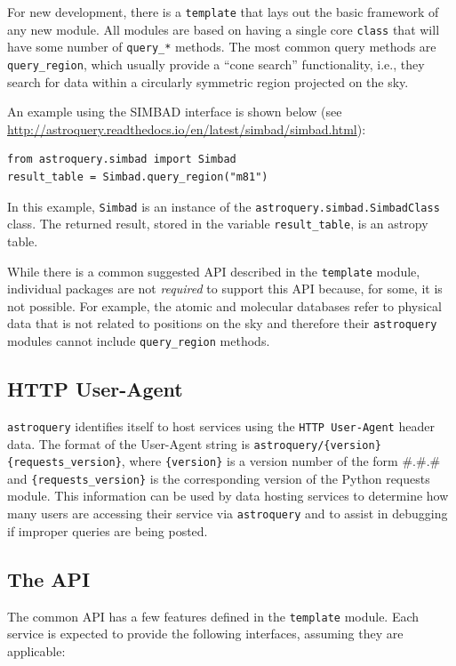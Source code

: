\documentclass[twocolumn]{aastex61}
\newcommand{\package}[1]{\texttt{#1}\xspace}
\newcommand{\astroquery}{\package{astroquery}}
\begin{document}
For new development, there is a \texttt{template}  that lays out the basic
framework of any new module.  All modules are based on having a single core
\texttt{class} that will have some number of \texttt{query\_*} methods.
The most common query methods are \texttt{query\_region}, which usually provide
a ``cone search'' functionality, i.e., they search for data within a circularly
symmetric region projected on the sky.

An example using the SIMBAD interface is shown below (see
\url{http://astroquery.readthedocs.io/en/latest/simbad/simbad.html}):
\begin{lstlisting}[caption=Query SIMBAD for a region around M81]
from astroquery.simbad import Simbad
result_table = Simbad.query_region("m81")
\end{lstlisting}
In this example, \texttt{Simbad} is an instance of the
\texttt{astroquery.simbad.SimbadClass} class.
The returned result, stored in the variable \texttt{result\_table},
is an astropy table.

While there is a common suggested API described in the \texttt{template} module,
individual packages are not \emph{required} to support this API because, for
some, it is not possible.  For example, the atomic and molecular databases refer
to physical data that is not related to positions on the sky and therefore
their \astroquery modules cannot include \texttt{query\_region} methods.

\subsection{HTTP User-Agent}
\astroquery identifies itself to host services using the \texttt{HTTP
User-Agent} header data.  The format of the User-Agent string is
\texttt{astroquery/\{version\} \{requests\_version\}}, where
\texttt{\{version\}} is a version number of the form \#.\#.\# and
\texttt{\{requests\_version\}} is the corresponding version of the Python
requests module.  This information can be used by data hosting services
to determine how many users are accessing their service via \astroquery
and to assist in debugging if improper queries are being posted.

\subsection{The API}
The common API has a few features defined in the \texttt{template} module.
Each service is expected to provide the following interfaces, assuming they are
applicable:
\end{document}
